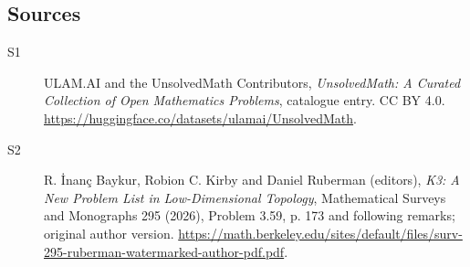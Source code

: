 \documentclass[11pt]{article}
\begin{document}
\subsection{Sources}
\begin{description}
\item[\hypertarget{source:statement:1}{S1}] ULAM.AI and the UnsolvedMath Contributors, \emph{UnsolvedMath: A Curated Collection of Open Mathematics Problems}, catalogue entry. CC BY 4.0. \url{https://huggingface.co/datasets/ulamai/UnsolvedMath}.
\item[\hypertarget{source:statement:2}{S2}] R. İnanç Baykur, Robion C. Kirby and Daniel Ruberman (editors), \emph{K3: A New Problem List in Low-Dimensional Topology}, Mathematical Surveys and Monographs 295 (2026), Problem 3.59, p. 173 and following remarks; original author version. \url{https://math.berkeley.edu/sites/default/files/surv-295-ruberman-watermarked-author-pdf.pdf}.
\end{description}
\label{end:statement}
\end{document}
